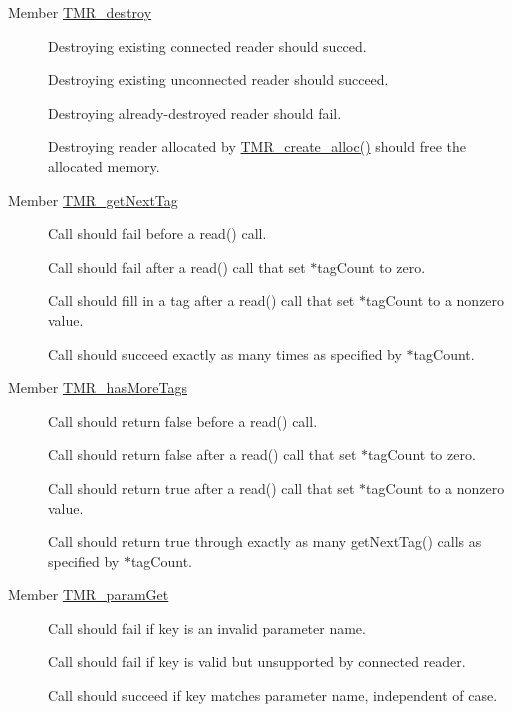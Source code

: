\label{test__test000004}
\hypertarget{test__test000004}{}
 \begin{description}
\item[Member \hyperlink{group__reader_gc0d51178a7d1d96ea82c8ea87b1697db}{TMR\_\-destroy} ]Destroying existing connected reader should succed. 

Destroying existing unconnected reader should succeed. 

Destroying already-destroyed reader should fail. 

Destroying reader allocated by \hyperlink{group__reader_g3a75a6998463bfdf20242a3fb9c82427}{TMR\_\-create\_\-alloc()} should free the allocated memory. \end{description}


\label{test__test000007}
\hypertarget{test__test000007}{}
 \begin{description}
\item[Member \hyperlink{group__reader_gbee8bf69ae6010858c5425956308292b}{TMR\_\-getNextTag} ]Call should fail before a read() call. 

Call should fail after a read() call that set $\ast$tagCount to zero. 

Call should fill in a tag after a read() call that set $\ast$tagCount to a nonzero value. 

Call should succeed exactly as many times as specified by $\ast$tagCount. \end{description}


\label{test__test000006}
\hypertarget{test__test000006}{}
 \begin{description}
\item[Member \hyperlink{group__reader_g5925392bbb7aeafc0996144f354a533a}{TMR\_\-hasMoreTags} ]Call should return false before a read() call. 

Call should return false after a read() call that set $\ast$tagCount to zero. 

Call should return true after a read() call that set $\ast$tagCount to a nonzero value. 

Call should return true through exactly as many getNextTag() calls as specified by $\ast$tagCount. \end{description}


\label{test__test000011}
\hypertarget{test__test000011}{}
 \begin{description}
\item[Member \hyperlink{group__reader_g799e9d2c2d6b254e689bc53570af8f15}{TMR\_\-paramGet} ]Call should fail if key is an invalid parameter name. 

Call should fail if key is valid but unsupported by connected reader. 

Call should succeed if key matches parameter name, independent of case. \end{description}


